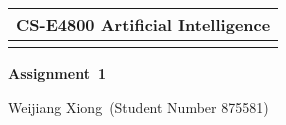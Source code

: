 \documentclass[a4paper,11pt]{article} %
\newcommand{\lineSpace}{1.1}
\newcommand{\exeNum}{1}
\newcommand{\assType}{Assignment}
\newcommand{\courseName}{CS-E4800 Artificial Intelligence}
\newcommand{\semester}{}
\newcommand{\studentName}{Weijiang Xiong}
\newcommand{\studentNumber}{875581}
\begin{document}
\linespread{\lineSpace} %




\thispagestyle{empty} %

\begin{tabular}{p{15.5cm}} %
	{\large \bf \courseName \hfill \semester} \\
	\hline %
	\\
\end{tabular} %


\begin{center} %
	{\Large \bf \assType\ \exeNum} %

	{\studentName\ (Student Number \studentNumber)} %

\end{center}
% 


\end{document}
